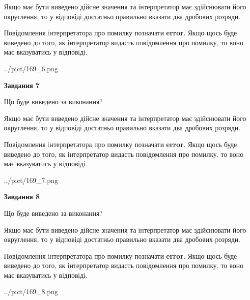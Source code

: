 \documentclass[12pt, ukrainian]{article}
\begin{document}
{\begin {Large}
Якщо має бути виведено дійсне значення та інтерпретатор має здійснювати його округлення, 
то у відповіді достатньо правильно вказати два дробових розряди.

Повідомлення інтерпретатора про помилку позначати \textbf{error}.
Якщо щось буде виведено до того, як інтерпретатор видасть повідомлення про помилку, 
то воно має вказуватись у відповіді. \par

\begin{center}
	{../pict/169_6.png}
\end{center}
\newpage

{\begin {center}\textbf{Завдання 7}\end {center}}\par
Що буде виведено за виконання? \par

Якщо має бути виведено дійсне значення та інтерпретатор має здійснювати його округлення, 
то у відповіді достатньо правильно вказати два дробових розряди.

Повідомлення інтерпретатора про помилку позначати \textbf{error}.
Якщо щось буде виведено до того, як інтерпретатор видасть повідомлення про помилку, 
то воно має вказуватись у відповіді. \par

\begin{center}
	{../pict/169_7.png}
\end{center}
\newpage

{\begin {center}\textbf{Завдання 8}\end {center}}\par
Що буде виведено за виконання? \par

Якщо має бути виведено дійсне значення та інтерпретатор має здійснювати його округлення, 
то у відповіді достатньо правильно вказати два дробових розряди.

Повідомлення інтерпретатора про помилку позначати \textbf{error}.
Якщо щось буде виведено до того, як інтерпретатор видасть повідомлення про помилку, 
то воно має вказуватись у відповіді. \par

\begin{center}
	{../pict/169_8.png}
\end{center}
\newpage


\end{Large}}
\end{document}

